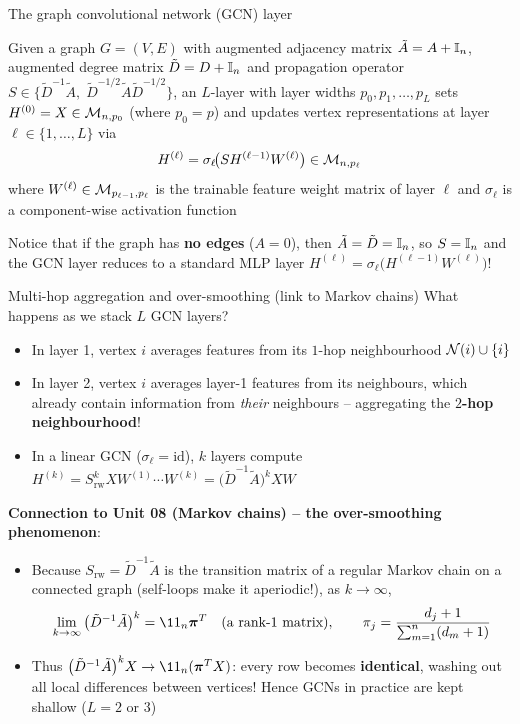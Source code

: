 \documentclass[aspectratio=169]{beamer}\usepackage[]{graphicx}\usepackage[]{xcolor}
\begin{document}
\begin{frame}{The graph convolutional network (GCN) layer}
\begin{importantdefinition}
\label{def:gcn-layer}
Given a graph $G = (V, E)$ with augmented adjacency matrix $\tilde{A} = A + \mathbb{I}_n$, augmented degree matrix $\tilde{D} = D + \mathbb{I}_n$ and propagation operator $S \in \big\{\tilde{D}^{-1}\tilde{A},\; \tilde{D}^{-1/2}\tilde{A}\tilde{D}^{-1/2}\big\}$, an $L$-layer  with layer widths $p_0, p_1, \ldots, p_L$ sets $H^{(0)} = X \in \mathcal{M}_{n, p_0}$ (where $p_0 = p$) and updates vertex representations at layer $\ell \in \{1, \ldots, L\}$ via
\[
H^{(\ell)} = \sigma_\ell\!\big(S H^{(\ell-1)} W^{(\ell)}\big) \in \mathcal{M}_{n, p_\ell}
\]
where $W^{(\ell)} \in \mathcal{M}_{p_{\ell-1}, p_\ell}$ is the trainable feature weight matrix of layer $\ell$ and $\sigma_\ell$ is a component-wise activation function
\end{importantdefinition}
\vfill
Notice that if the graph has \textbf{no edges} ($A = 0$), then $\tilde{A} = \tilde{D} = \mathbb{I}_n$, so $S = \mathbb{I}_n$ and the GCN layer reduces to a standard MLP layer $H^{(\ell)} = \sigma_\ell\big(H^{(\ell-1)} W^{(\ell)}\big)$!
\end{frame}


\begin{frame}{Multi-hop aggregation and over-smoothing (link to Markov chains)}
What happens as we stack $L$ GCN layers?
\begin{itemize}
\item In layer 1, vertex $i$ averages features from its $1$-hop neighbourhood $\mathcal{N}(i) \cup \{i\}$
\item In layer 2, vertex $i$ averages layer-1 features from its neighbours, which already contain information from \emph{their} neighbours -- aggregating the \textbf{$2$-hop neighbourhood}!
\item In a linear GCN ($\sigma_\ell = \text{id}$), $k$ layers compute $H^{(k)} = S_{\text{rw}}^k X W^{(1)} \cdots W^{(k)} = \big(\tilde{D}^{-1}\tilde{A}\big)^k X W$
\end{itemize}
\vfill
\textbf{Connection to Unit 08 (Markov chains) -- the over-smoothing phenomenon}:
\begin{itemize}
\item Because $S_{\text{rw}} = \tilde{D}^{-1}\tilde{A}$ is the transition matrix of a regular Markov chain on a connected graph (self-loops make it aperiodic!), as $k \to \infty$,
\[
\lim_{k \to \infty} \big(\tilde{D}^{-1}\tilde{A}\big)^k = \11_n \bm{\pi}^T \quad (\text{a rank-1 matrix}), \qquad \pi_j = \frac{d_j + 1}{\sum_{m=1}^n (d_m + 1)}
\]
\item Thus $\big(\tilde{D}^{-1}\tilde{A}\big)^k X \to \11_n (\bm{\pi}^T X)$: every row becomes \textbf{identical}, washing out all local differences between vertices! Hence GCNs in practice are kept shallow ($L = 2$ or $3$)
\end{itemize}
\end{frame}
\end{document}
